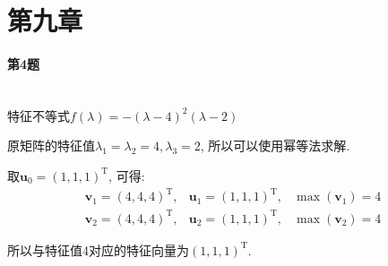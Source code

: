 \documentclass[a4paper]{article}
\begin{document}
{\centering\section*{第九章}}

\paragraph{第4题}~{}
\\

特征不等式$f(\lambda) = -(\lambda-4)^2(\lambda-2)$ \par
原矩阵的特征值$\lambda_1 = \lambda_2 = 4, \lambda_3 = 2$, 所以可以使用幂等法求解. \par
取$\boldsymbol{u}_0 = (1, 1, 1)^{\mathrm{T}}$, 可得: 
\begin{equation}
    \begin{array}{lll}\boldsymbol{v}_{1}=(4,4,4)^{\mathrm{T}}, & \boldsymbol{u}_{1}=(1,1,1)^{\mathrm{T}}, & \max \left(\boldsymbol{v}_{1}\right)=4 \\ \boldsymbol{v}_{2}=(4,4,4)^{\mathrm{T}}, & \boldsymbol{u}_{2}=(1,1,1)^{\mathrm{T}}, & \max \left(\boldsymbol{v}_{2}\right)=4\end{array}\nonumber
\end{equation} \par
所以与特征值4对应的特征向量为$(1, 1, 1)^{\mathrm{T}}$.
\end{document}
